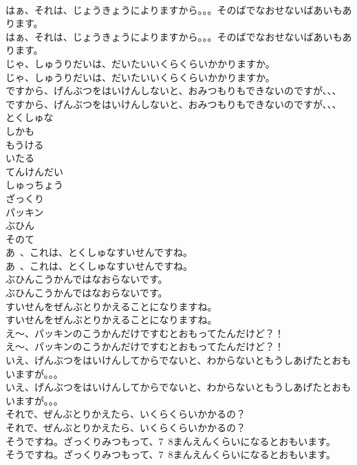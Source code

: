 \documentclass[8pt]{extreport}
\begin{document}
\begin{CJK}{UTF8}{min}
\\	はぁ、それは、じょうきょうによりますから。。。そのばでなおせないばあいもあります。	
\\	はぁ、それは、じょうきょうによりますから。。。そのばでなおせないばあいもあります。 
\\	じゃ、しゅうりだいは、だいたいいくらくらいかかりますか。	
\\	じゃ、しゅうりだいは、だいたいいくらくらいかかりますか。 
\\	ですから、げんぶつをはいけんしないと、おみつもりもできないのですが、、、	
\\	ですから、げんぶつをはいけんしないと、おみつもりもできないのですが、、、 
\\	とくしゅな
\\	しかも
\\	もうける
\\	いたる
\\	てんけんだい
\\	しゅっちょう
\\	ざっくり
\\	パッキン
\\	ぶひん
\\	そのて
\\	あ~、これは、とくしゅなすいせんですね。	
\\	あ~、これは、とくしゅなすいせんですね。 
\\	ぶひんこうかんではなおらないです。	
\\	ぶひんこうかんではなおらないです。 
\\	すいせんをぜんぶとりかえることになりますね。	
\\	すいせんをぜんぶとりかえることになりますね。 
\\	え～、パッキンのこうかんだけですむとおもってたんだけど？！	
\\	え～、パッキンのこうかんだけですむとおもってたんだけど？！ 
\\	いえ、げんぶつをはいけんしてからでないと、わからないともうしあげたとおもいますが。。。	
\\	いえ、げんぶつをはいけんしてからでないと、わからないともうしあげたとおもいますが。。。 
\\	それで、ぜんぶとりかえたら、いくらくらいかかるの？	
\\	それで、ぜんぶとりかえたら、いくらくらいかかるの？ 
\\	そうですね。ざっくりみつもって、7~8まんえんくらいになるとおもいます。	
\\	そうですね。ざっくりみつもって、7~8まんえんくらいになるとおもいます。 

\end{CJK}
\end{document}

